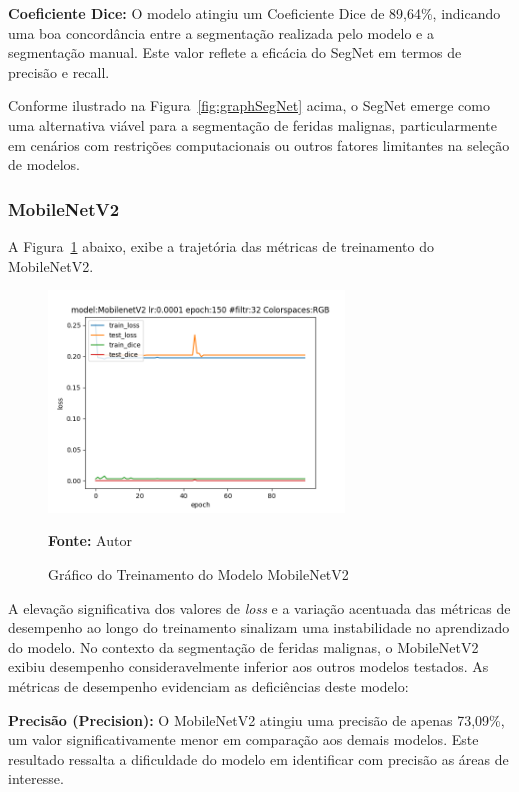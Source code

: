 \textbf{Coeficiente Dice:} O modelo atingiu um Coeficiente Dice de 89,64\%, indicando uma boa concordância entre a segmentação realizada pelo modelo e a segmentação manual. Este valor reflete a eficácia do \ac{SegNet} em termos de precisão e recall.

Conforme ilustrado na Figura~\ref{fig:graphSegNet} acima, o \ac{SegNet} emerge como uma alternativa viável para a segmentação de feridas malignas, particularmente em cenários com restrições computacionais ou outros fatores limitantes na seleção de modelos.
         
\subsubsection{MobileNetV2}
A Figura~\ref{fig:graphMobileNetV2} abaixo, exibe a trajetória das métricas de treinamento do \ac{MobileNetV2}. 

\begin{figure}[htbp]
    \centering
    \caption{Gráfico do Treinamento do Modelo \acf{MobileNetV2}}
    \includegraphics[width=0.7\textwidth]{img/mobilenetv2prunedmodelfile.png}
    \label{fig:graphMobileNetV2}
    \par\medskip\textbf{Fonte:} Autor
\end{figure}

A elevação significativa dos valores de \textit{loss} e a variação acentuada das métricas de desempenho ao longo do treinamento sinalizam uma instabilidade no aprendizado do modelo. No contexto da segmentação de feridas malignas, o \ac{MobileNetV2} exibiu desempenho consideravelmente inferior aos outros modelos testados. As métricas de desempenho evidenciam as deficiências deste modelo:

\textbf{Precisão (Precision):} O MobileNetV2 atingiu uma precisão de apenas 73,09\%, um valor significativamente menor em comparação aos demais modelos. Este resultado ressalta a dificuldade do modelo em identificar com precisão as áreas de interesse.

